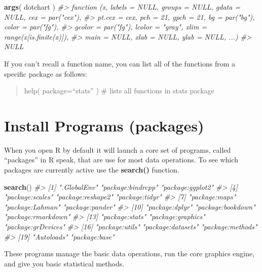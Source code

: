 \documentclass[]{book}
\newenvironment{Shaded}{\begin{snugshade}}{\end{snugshade}}
\newcommand{\CommentTok}[1]{\textcolor[rgb]{0.56,0.35,0.01}{\textit{#1}}}
\newcommand{\KeywordTok}[1]{\textcolor[rgb]{0.13,0.29,0.53}{\textbf{#1}}}
\newcommand{\NormalTok}[1]{#1}
\theoremstyle{definition}
\theoremstyle{definition}
\theoremstyle{definition}
\theoremstyle{remark}
\begin{document}
\begin{Shaded}
\begin{Highlighting}[]
\KeywordTok{args}\NormalTok{( dotchart )}
\CommentTok{#> function (x, labels = NULL, groups = NULL, gdata = NULL, cex = par("cex"), }
\CommentTok{#>     pt.cex = cex, pch = 21, gpch = 21, bg = par("bg"), color = par("fg"), }
\CommentTok{#>     gcolor = par("fg"), lcolor = "gray", xlim = range(x[is.finite(x)]), }
\CommentTok{#>     main = NULL, xlab = NULL, ylab = NULL, ...) }
\CommentTok{#> NULL}
\end{Highlighting}
\end{Shaded}

If you can't recall a function name, you can list all of the functions
from a specific package as follows:

\begin{quote}
help( package=``stats'' ) \# lists all functions in stats package
\end{quote}

\hypertarget{install-programs-packages}{%
\section{Install Programs (packages)}\label{install-programs-packages}}

When you open R by default it will launch a core set of programs, called
``packages'' in R speak, that are use for most data operations. To see
which packages are currently active use the \textbf{search()} function.

\begin{Shaded}
\begin{Highlighting}[]
\KeywordTok{search}\NormalTok{()}
\CommentTok{#>  [1] ".GlobalEnv"        "package:bindrcpp"  "package:ggplot2"  }
\CommentTok{#>  [4] "package:scales"    "package:reshape2"  "package:tidyr"    }
\CommentTok{#>  [7] "package:maps"      "package:Lahman"    "package:pander"   }
\CommentTok{#> [10] "package:dplyr"     "package:bookdown"  "package:rmarkdown"}
\CommentTok{#> [13] "package:stats"     "package:graphics"  "package:grDevices"}
\CommentTok{#> [16] "package:utils"     "package:datasets"  "package:methods"  }
\CommentTok{#> [19] "Autoloads"         "package:base"}
\end{Highlighting}
\end{Shaded}

These programs manage the basic data operations, run the core graphics
engine, and give you basic statistical methods.
\end{document}
